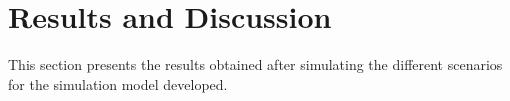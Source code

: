 \section{Results and Discussion}

This section presents the results obtained after simulating the different scenarios for the simulation model developed.  
